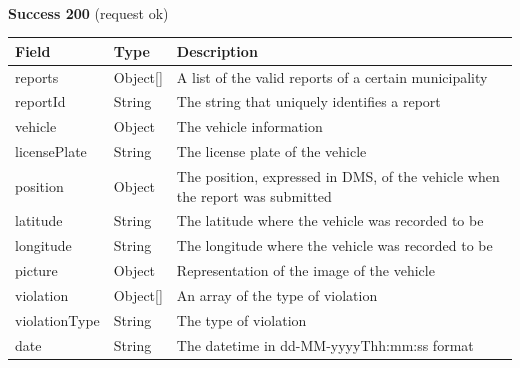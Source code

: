 						\paragraph{}
							\textbf{Success 200} (request ok)
							\begin{table}[!h]
								\begin{tabular}{L{0.25\textwidth}L{0.1\textwidth}L{0.45\textwidth}}
									\toprule
									Field & Type & Description \\
									\midrule
									reports & Object[] & A list of the valid reports of a certain municipality \\
									\hspace{2.5mm}reportId & String & The string that uniquely identifies a report \\
									\hspace{2.5mm}vehicle & Object & The vehicle information \\
									\hspace{5mm}licensePlate & String & The license plate of the vehicle \\
									\hspace{2.5mm}position & Object & The position, expressed in DMS, of the vehicle when the report was submitted  \\
									\hspace{5mm}latitude & String & The latitude where the vehicle was recorded to be \\
									\hspace{5mm}longitude & String & The longitude where the vehicle was recorded to be \\
									\hspace{2.5mm}picture & Object & Representation of the image of the vehicle \\
									\hspace{2.5mm}violation & Object[] & An array of the type of violation \\
									\hspace{5mm}violationType & String & The type of violation \\
									\hspace{2.5mm}date & String & The datetime in \newline dd-MM-yyyyThh:mm:ss format \\
								 	\bottomrule
								\end{tabular}
							\end{table}
